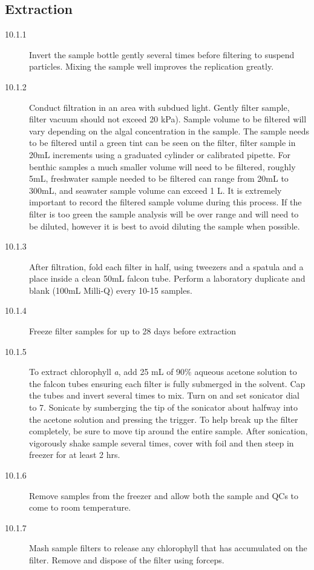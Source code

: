 \documentclass[12pt]{../SOP2}
\begin{document}
\subsection{Extraction}
\begin{description}
\item[10.1.1] Invert the sample bottle gently several times before filtering to suspend particles. Mixing the sample well improves the replication greatly.
\item[10.1.2] Conduct filtration in an area with subdued light. Gently filter sample, filter vacuum should not exceed 20 kPa). Sample volume to be filtered will vary depending on the algal concentration in the sample. The sample needs to be filtered until a green tint can be seen on the filter, filter sample in 20mL increments using a graduated cylinder or calibrated pipette. For benthic samples a much smaller volume will need to be filtered, roughly 5mL, freshwater sample needed to be filtered can range from 20mL to 300mL, and seawater sample volume can exceed 1 L. It is extremely important to record the filtered sample volume during this process. If the filter is too green the sample analysis will be over range and will need to be diluted, however it is best to avoid diluting the sample when possible. 
\item[10.1.3] After filtration, fold each filter in half, using tweezers and a spatula and a place inside a clean 50mL falcon tube. Perform a laboratory duplicate and blank (100mL Milli-Q) every 10-15 samples.
\item[10.1.4] Freeze filter samples for up to 28 days before extraction
\item[10.1.5] To extract chlorophyll \textit{a}, add 25 mL of 90\% aqueous acetone solution to the falcon tubes ensuring each filter is fully submerged in the solvent. Cap the tubes and invert several times to mix. Turn on and set sonicator dial to 7. Sonicate by sumberging the tip of the sonicator about halfway into the acetone solution and pressing the trigger. To help break up the filter completely, be sure to move tip around the entire sample. After sonication, vigorously shake sample several times, cover with foil and then steep in freezer for at least 2 hrs.
\item[10.1.6] Remove samples from the freezer and allow both the sample and QCs to come to room temperature. 
\item[10.1.7] Mash sample filters to release any chlorophyll that has accumulated on the filter. Remove and dispose of the filter using forceps.

\end{description}
\end{document}
